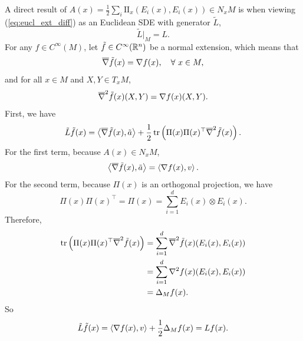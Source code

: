 \begin{rmk}
    A direct result of $A(x) = \frac{1}{2} \sum_{i} \mathrm{II}_x(E_i(x),E_i(x)) \in N_xM$ is when viewing (\ref{eq:eucl_ext_diff}) as an Euclidean SDE with generator $\tilde{L}$,
    \begin{equation*}
        \tilde{L}|_M = L.
    \end{equation*}
    For any $f \in C^\infty(M)$, let $\tilde{f} \in C^\infty(\mathbb{R}^n)$ be a normal extension, which means that
    \begin{equation*}
        \overline{\nabla}\tilde{f}(x) = \nabla f(x),\quad \forall~x \in M,
    \end{equation*}
    and for all $x \in M$ and $X,Y \in T_xM$,
    \begin{equation*}
        \overline{\nabla}^2\tilde{f}(x)(X,Y) = \nabla f(x)(X,Y).
    \end{equation*}
    First, we have
    \begin{equation*}
        \tilde{L}\tilde{f}(x) = \left\langle \overline{\nabla}\tilde{f}(x),\tilde{a} \right\rangle + \frac{1}{2}\operatorname{tr}\left(\Pi(x)\Pi(x)^\top \overline{\nabla}^2\tilde{f}(x)\right).
    \end{equation*}
    For the first term, because $A(x) \in N_xM$,
    \begin{equation*}
        \left\langle \overline{\nabla}\tilde{f}(x),\tilde{a} \right\rangle = \left\langle \nabla f(x),v \right\rangle.
    \end{equation*}
    For the second term, because $\Pi(x)$ is an orthogonal projection, we have
    \begin{equation*}
        \Pi(x)\Pi(x)^\top = \Pi(x) = \sum_{i=1}^d E_i(x) \otimes E_i(x).
    \end{equation*}
    Therefore,
    \begin{align*}
        \operatorname{tr}\left(\Pi(x)\Pi(x)^\top \overline{\nabla}^2\tilde{f}(x)\right) &= \sum_{i=1}^d \overline{\nabla}^2\tilde{f}(x)(E_i(x), E_i(x)) \\
        &= \sum_{i=1}^d \nabla^2 f(x)(E_i(x), E_i(x)) \\
        &= \Delta_M f(x).
    \end{align*}
    So
    \begin{equation*}
        \tilde{L}\tilde{f}(x) = \left\langle \nabla f(x),v \right\rangle + \frac{1}{2}\Delta_M f(x) = L f(x).
    \end{equation*}
\end{rmk}

